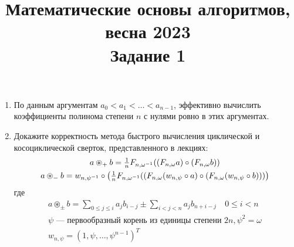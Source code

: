 \documentclass[11pt]{article}
\newenvironment{exercise}{\item}{}
\newcommand{\w}{\omega}
\begin{document}
\noindent

 \title{Математические основы алгоритмов, весна 2023 \\ Задание 1}
 \date{}
 \author{}
 \maketitle

\begin{enumerate}

\begin{exercise}
По данным аргументам $a_0 < a_1 < \ldots < a_{n-1}$,
эффективно вычислить коэффициенты полинома степени $n$ с нулями ровно в этих аргументах.
\end{exercise}

\begin{exercise}
Докажите корректность метода быстрого вычисления циклической и косоциклической сверток,
представленного в лекциях:
%
\begin{gather*}
\textstyle a \circledast_+ b = \frac{1}{n} F_{n,\w^{-1}}\lr*{(F_{n,\w}a)\circ (F_{n,\w}b)}\\
%
\textstyle a \circledast_- b = w_{n,\psi^{-1}} \circ 
\lr*{\frac{1}{n} F_{n,\w^{-1}}\lr*{
  (F_{n,\w} (w_{n,\psi} \circ a)\circ (F_{n,\w} (w_{n,\psi} \circ b))}}
\end{gather*}
%
где
%
\begin{gather*}
a \circledast_{\pm} b
= \sum_{0 \leq j \leq i} a_j b_{i-j} \pm 
  \sum_{i < j < n} a_j b_{n+i-j}\quad 0 \leq i < n\\
\text{$\psi$ --- первообразный корень из единицы степени $2n$},
\psi^2 = \w\\
w_{n,\psi} = (1,\psi,\ldots,\psi^{n-1})^T
\end{gather*}

\end{exercise}


\end{enumerate}
\end{document}
